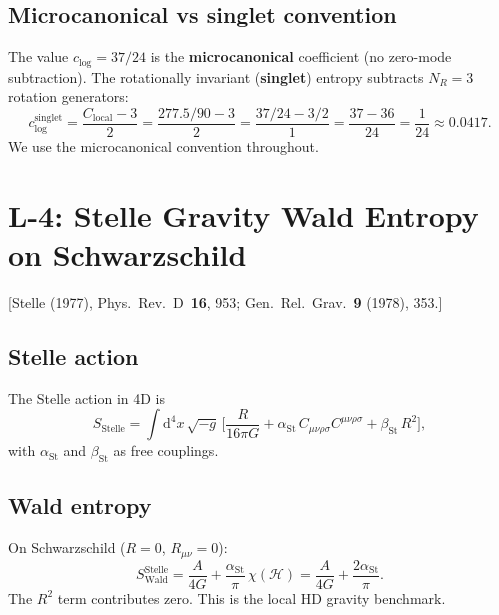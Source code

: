 \documentclass[12pt,a4paper]{article}
\theoremstyle{definition}
\theoremstyle{remark}
\newcommand{\Weylsq}{C_{\mu\nu\rho\sigma}C^{\mu\nu\rho\sigma}}
\newcommand{\dd}{\mathrm{d}}
\newcommand{\fromlit}[1]{\textcolor{blue!70!black}{\textsf{[#1]}}}
\begin{document}
\subsection{Microcanonical vs singlet convention}

The value $c_{\log} = 37/24$ is the \textbf{microcanonical}
coefficient (no zero-mode subtraction).  The rotationally invariant
(\textbf{singlet}) entropy subtracts $N_R = 3$ rotation generators:
\begin{equation}
  c_{\log}^{\mathrm{singlet}}
  = \frac{C_{\mathrm{local}} - 3}{2}
  = \frac{277.5/90 - 3}{2}
  = \frac{37/24 - 3/2}{1}
  = \frac{37 - 36}{24}
  = \frac{1}{24}
  \approx 0.0417.
\end{equation}
We use the microcanonical convention throughout.


\section{L-4: Stelle Gravity Wald Entropy on Schwarzschild}
\label{sec:L4}

\fromlit{Stelle (1977), Phys.\ Rev.\ D~\textbf{16}, 953;
Gen.\ Rel.\ Grav.~\textbf{9} (1978), 353.}

\subsection{Stelle action}

The Stelle action in 4D is
\begin{equation}\label{eq:stelle}
  S_{\mathrm{Stelle}} = \int\dd^4 x\,\sqrt{-g}\,
  \biggl[\frac{R}{16\pi G}
  + \alpha_{\mathrm{St}}\,\Weylsq
  + \beta_{\mathrm{St}}\,R^2\biggr],
\end{equation}
with $\alpha_{\mathrm{St}}$ and $\beta_{\mathrm{St}}$ as free
couplings.

\subsection{Wald entropy}

On Schwarzschild ($R = 0$, $R_{\mu\nu} = 0$):
\begin{equation}
  S_{\mathrm{Wald}}^{\mathrm{Stelle}}
  = \frac{A}{4G} + \frac{\alpha_{\mathrm{St}}}{\pi}\,
  \chi(\mathcal{H})
  = \frac{A}{4G} + \frac{2\alpha_{\mathrm{St}}}{\pi}.
\end{equation}
The $R^2$ term contributes zero.  This is the local HD gravity
benchmark.
\end{document}
